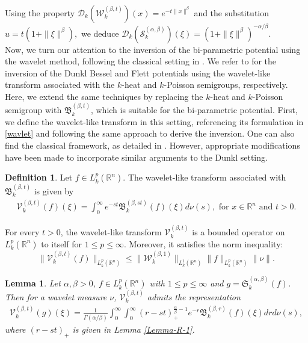\documentclass[11pt,a4paper,reqno]{amsproc}
\newtheorem{lemma}[theorem]{Lemma}
\theoremstyle{definition}
\newtheorem{definition}[theorem]{Definition}
\theoremstyle{remark}
\numberwithin{equation}{section}
\begin{document}
Using the property $\mathcal{D}_k\left( \mathcal{W}_k^{(\beta,t)} \right)(x)=e^{-t\|x\|^\beta}$ and the substitution $u=t(1+\|\xi\|^\beta),$ we deduce $\mathcal{D}_k\left( \mathcal{S}_k^{(\alpha, \beta)} \right)(\xi) = (1+\|\xi\|^\beta)^{-\alpha/\beta}$.  \\
Now, we turn our attention to the inversion of the bi-parametric potential using the wavelet method, following the classical setting in \cite{Sezer}. We refer to \cite{Ben-Said-2022, Ben, Kallel} for the inversion of the Dunkl Bessel and Flett potentials using the wavelet-like transform associated with the $k$-heat and $k$-Poisson semigroups, respectively. Here, we extend the same techniques by replacing the $k$-heat and $k$-Poisson semigroup with $\mathfrak{B}_k^{(\beta,t)}$, which is suitable for the bi-parametric potential. First, we define the wavelet-like transform in this setting, referencing its formulation in \eqref{wavlet} and following the same approach to derive the inversion. One can also find the classical framework, as detailed in \cite{Aliev}. However, appropriate modifications have been made to incorporate similar arguments to the Dunkl setting.

\begin{definition} Let $f\in L_k^p(\mathbb{R}^n)$. The wavelet-like transform associated with $\mathfrak{B}_k^{(\beta,t)}$ is given by 
\begin{align} \label{Wavelet-2}
    \mathcal{V}_{k}^{(\beta,t)}(f)(\xi)= \int_0^\infty e^{-st} \mathfrak{B}_k^{(\beta,st)}(f)(\xi) d\nu(s), \text{   for  } x\in \mathbb{R}^n \text{  and  } t>0.
\end{align}
\end{definition}
For every $t>0$, the wavelet-like transform $\mathcal{V}_k^{(\beta,t)}$ is a bounded operator on $L_k^p(\mathbb{R}^n)$ to itself for $1\leq p \leq\infty$. Moreover, it satisfies the norm inequality:
$$\| \mathcal{V}_k^{(\beta,t)}(f)\|_{L_k^p(\mathbb{R}^n)} \leq \|\mathcal{W}_k^{(\beta,1)}\|_ {L_k^1(\mathbb{R}^n)}\|f\|_{L_k^p(\mathbb{R}^n)}\|\nu\|.$$
\begin{lemma} \label{Lemma-P-1}
     Let $\alpha, \beta>0$,  $f\in L_k^p(\mathbb{R}^n)$ with $1\leq p \leq \infty$ and $g=\mathfrak{S}_k^{(\alpha, \beta)}(f)$. Then for a wavelet measure $\nu$, $\mathcal{V}_k^{(\beta, t)}$ admits the representation
     \begin{align*}
         \mathcal{V}_k^{(\beta, t)}(g)(\xi)= \frac{1}{\Gamma(\alpha / \beta)} \int_0^\infty \int_{0}^\infty (r-st)_+^{\frac{\alpha}{\beta}-1} e^{-r}\mathfrak{B}_k^{(\beta, r)}(f)(\xi) dr d\nu(s),
    \end{align*}  
 where $ (r-st)_+$   is given in Lemma \ref{Lemma-R-1}.
\end{lemma}
\end{document}
